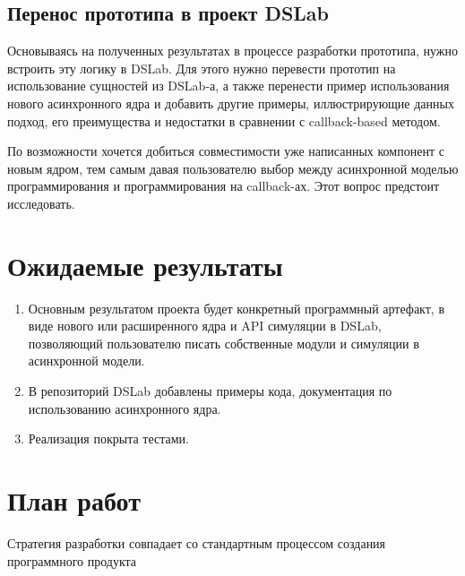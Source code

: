 \subsection{Перенос прототипа в проект DSLab}

Основываясь на полученных результатах в процессе разработки прототипа, нужно встроить эту логику в DSLab. Для этого нужно перевести прототип на использование сущностей из DSLab-а, а также перенести пример использования нового асинхронного ядра и добавить другие примеры, иллюстрирующие данных подход, его преимущества и недостатки в сравнении с callback-based методом. 

По возможности хочется добиться совместимости уже написанных компонент с новым ядром, тем самым давая пользователю выбор между асинхронной моделью программирования и программирования на callback-ах. Этот вопрос предстоит исследовать. 

\newpage 
\section{Ожидаемые результаты}

\begin{enumerate}
    \item 
    Основным результатом проекта будет конкретный программный артефакт, в виде нового или расширенного ядра и API симуляции в DSLab, позволяющий пользователю писать собственные модули и симуляции в асинхронной модели. 
    \item В репозиторий DSLab \cite{dslab-repo} добавлены примеры кода, документация по использованию асинхронного ядра.
    \item Реализация покрыта тестами.
\end{enumerate}
    
\section{План работ}

Стратегия разработки совпадает со стандартным процессом создания программного продукта 

